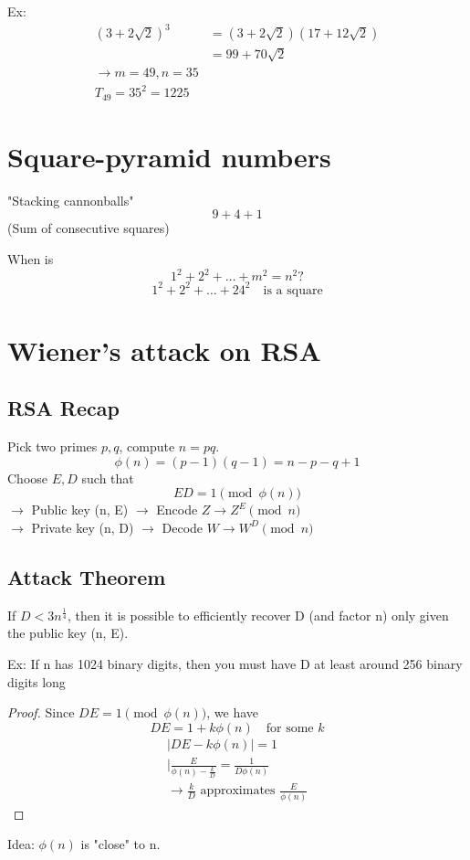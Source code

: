     Ex: 
    \begin{align*}
        (3+2\sqrt{2})^3 &= (3 + 2\sqrt{2})(17+12\sqrt{2}) \\
        &= 99+70\sqrt{2} \\
        \rightarrow m = 49, n = 35 \\
        T_{49} = 35^2 = 1225
    \end{align*}

\section{Square-pyramid numbers}
    "Stacking cannonballs"
    \[
        9+4+1
    \]
    (Sum of consecutive squares)

    When is 
    \[
        1^2 + 2^2 + \dots + m^2 = n^2?
    \]
    \[
        1^2 + 2^2 + \dots + 24^2 \quad\text{is a square}
    \]

\section{Wiener's attack on RSA}
    \subsection{RSA Recap}
    Pick two primes $p,q$, compute $n=pq$. 
    \[
        \phi(n) = (p-1)(q-1) = n-p-q+1
    \]
    Choose $E,D$ such that 
    \[
        ED = 1\pmod{\phi(n)}
    \]
    $\rightarrow$ Public key (n, E) $\rightarrow$ Encode $Z\rightarrow Z^E\pmod{n}$ \\
    $\rightarrow$ Private key (n, D) $\rightarrow$ Decode $W\rightarrow W^D\pmod{n}$

    \subsection{Attack Theorem}
    \begin{theorem}
        If $D < 3n^{\frac{1}{4}}$, then it is possible to efficiently recover D (and factor n)
        only given the public key (n, E).
    \end{theorem}
    Ex: If n has 1024 binary digits, then you must have D at least 
    around 256 binary digits long

    \begin{proof}
        Since $DE = 1\pmod{\phi(n)}$, we have 
        \[
            DE = 1 + k\phi(n)\quad\text{for some } k
        \]
        \begin{align*}
            |DE - k\phi(n)| = 1 \\
            |\frac{E}{\phi(n) - \frac{k}{D}} = \frac{1}{D\phi(n)} \\
            \rightarrow \frac{k}{D} \text{ approximates } \frac{E}{\phi(n)} 
        \end{align*}
    \end{proof}
    Idea: $\phi(n)$ is "close" to n. 

